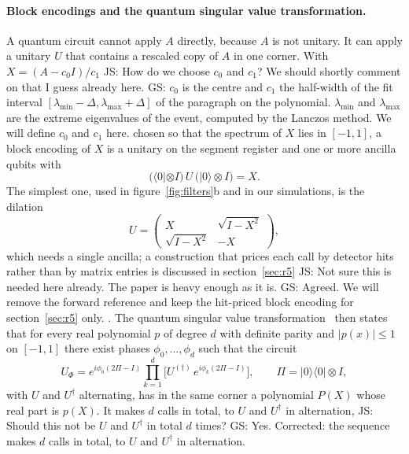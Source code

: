 \documentclass[11pt,a4paper]{article}
\newcommand{\js}[1]{{\color{blue} JS: #1 }}
\newcommand{\gs}[1]{{\color{orange!85!black} GS: #1 }}
\begin{document}
\paragraph{Block encodings and the quantum singular value transformation.}
A quantum circuit cannot apply $A$ directly, because $A$ is not unitary. It can apply a unitary $U$
that contains a rescaled copy of $A$ in one corner. With $X=(A-c_0I)/c_1$ \js{How do we choose $c_0$ and $c_1$? We should shortly comment on that I guess already here.} \gs{$c_0$ is the centre and $c_1$ the half-width of the fit interval $[\lambda_{\min}-\Delta,\lambda_{\max}+\Delta]$ of the paragraph on the polynomial. $\lambda_{\min}$ and $\lambda_{\max}$ are the extreme eigenvalues of the event, computed by the Lanczos method. We will define $c_0$ and $c_1$ here.} chosen so that the spectrum
of $X$ lies in $[-1,1]$, a block encoding of $X$ is a unitary on the segment register and one or more
ancilla qubits with
\begin{equation}
\big(\langle0|\otimes I\big)\,U\,\big(|0\rangle\otimes I\big)=X .
\end{equation}
The simplest one, used in figure~\ref{fig:filters}b and in our simulations, is the dilation
\begin{equation}
U=\begin{pmatrix}X&\sqrt{I-X^2}\\ \sqrt{I-X^2}&-X\end{pmatrix},
\end{equation}
which needs a single ancilla; a construction that prices each call by detector hits rather than by
matrix entries is discussed in section~\ref{sec:r5} \js{Not sure this is needed here already. The paper is heavy enough as it is.} \gs{Agreed. We will remove the forward reference and keep the hit-priced block encoding for section~\ref{sec:r5} only.}. The quantum singular value
transformation~\cite{gslw2019,martyn2021} then states that for every real polynomial $p$ of degree
$d$ with definite parity and $|p(x)|\le1$ on $[-1,1]$ there exist phases $\phi_0,\dots,\phi_d$ such
that the circuit
\begin{equation}
U_\Phi=e^{i\phi_0(2\Pi-I)}\prod_{k=1}^{d}\Big[U^{(\dagger)}\,e^{i\phi_k(2\Pi-I)}\Big],\qquad \Pi=|0\rangle\langle0|\otimes I,
\end{equation}
with $U$ and $U^\dagger$ alternating, has in the same corner a polynomial $P(X)$ whose real part is
$p(X)$. It makes $d$ calls in total, to $U$ and $U^\dagger$ in alternation, \js{Should this not be $U$ and $U^\dagger$ in total $d$ times?} \gs{Yes. Corrected: the sequence makes $d$ calls in total, to $U$ and $U^\dagger$ in alternation.}
\end{document}

